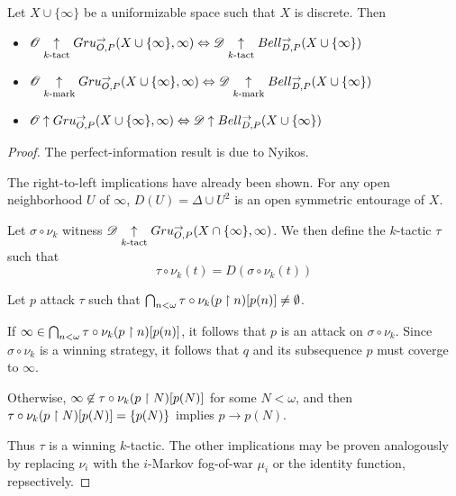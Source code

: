 \begin{thm}
  Let $X\cup\{\infty\}$ be a uniformizable space such that $X$ is discrete. Then
  \begin{itemize}
    \item
      $
        \mathscr{O}\underset{k\text{-tact}}{\uparrow} Gru_{O,P}^{\to}(X\cup\{\infty\},\infty)
          \Leftrightarrow
        \mathscr{D} \underset{k\text{-tact}}{\uparrow} Bell_{D,P}^{\to}(X\cup\{\infty\})
      $
    \item
      $
        \mathscr{O}\underset{k\text{-mark}}{\uparrow} Gru_{O,P}^{\to}(X\cup\{\infty\},\infty)
          \Leftrightarrow
        \mathscr{D} \underset{k\text{-mark}}{\uparrow} Bell_{D,P}^{\to}(X\cup\{\infty\})
      $
    \item
      $
        \mathscr{O}\uparrow Gru_{O,P}^{\to}(X\cup\{\infty\},\infty)
          \Leftrightarrow
        \mathscr{D} \uparrow Bell_{D,P}^{\to}(X\cup\{\infty\})
      $
  \end{itemize}
\end{thm}

\begin{proof}
  The perfect-information result is due to Nyikos.

  The right-to-left implications have already been shown.
  For any open neighborhood $U$ of $\infty$,
  $D(U)=\Delta\cup U^2$ is an open symmetric entourage of $X$.

  Let $\sigma\circ\nu_k$ witness
  $\mathscr{D} \underset{k\text{-tact}}{\uparrow}Gru_{O,P}^{\to}(X\cap\{\infty\},\infty)$. We then define
  the $k$-tactic $\tau$ such that
    \[
      \tau\circ\nu_k(t) = D(\sigma\circ\nu_k(t))
    \]

  Let $p$ attack $\tau$ such that
  $\bigcap_{n<\omega}\tau\circ\nu_k(p\restriction n)[p(n)]\not=\emptyset$.

  If $\infty\in\bigcap_{n<\omega}\tau\circ\nu_k(p\restriction n)[p(n)]$, it follows
  that $p$
  is an attack on $\sigma\circ\nu_k$. Since $\sigma\circ\nu_k$ is a winning
  strategy, it follows
  that $q$ and its subsequence $p$ must coverge to $\infty$.

  Otherwise, $\infty\not\in\tau\circ\nu_k(p\restriction N)[p(N)]$ for some $N<\omega$,
  and then
  $\tau\circ\nu_k(p\restriction N)[p(N)]=\{p(N)\}$ implies $p\to p(N)$.

  Thus $\tau$ is a winning $k$-tactic. The other implications may
  be proven analogously by
  replacing $\nu_i$ with the $i$-Markov fog-of-war $\mu_i$ or the identity
  function, repsectively.
\end{proof}


